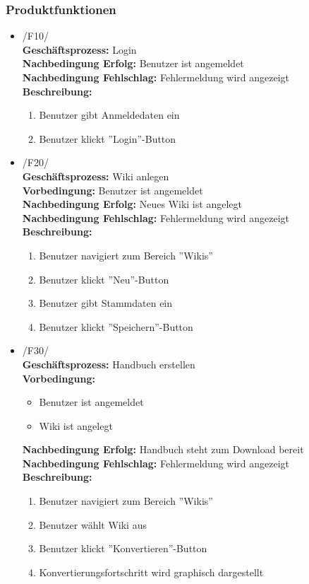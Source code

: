 \label{app:pflichtenheft}

\subsubsection*{Produktfunktionen}

	\begin{itemize}
		\item 
			/F10/ \\
			\textbf{Geschäftsprozess:} Login \\
			\textbf{Nachbedingung Erfolg:} Benutzer ist angemeldet \\
			\textbf{Nachbedingung Fehlschlag:} Fehlermeldung wird angezeigt \\
			\textbf{Beschreibung:}
			\begin{enumerate}
				\item Benutzer gibt Anmeldedaten ein
				\item Benutzer klickt ''Login''-Button
			\end{enumerate}
		\item 
			/F20/ \\
			\textbf{Geschäftsprozess:} Wiki anlegen \\
			\textbf{Vorbedingung:} Benutzer ist angemeldet \\
			\textbf{Nachbedingung Erfolg:} Neues Wiki ist angelegt \\
			\textbf{Nachbedingung Fehlschlag:} Fehlermeldung wird angezeigt \\
			\textbf{Beschreibung:}
			\begin{enumerate}
				\item Benutzer navigiert zum Bereich ''Wikis''
				\item Benutzer klickt ''Neu''-Button
				\item Benutzer gibt Stammdaten ein
				\item Benutzer klickt ''Speichern''-Button
			\end{enumerate}
		\item 
			/F30/ \\
			\textbf{Geschäftsprozess:} Handbuch erstellen \\
			\textbf{Vorbedingung:}
			\begin{itemize}
				\item Benutzer ist angemeldet
				\item Wiki ist angelegt
			\end{itemize}
			\textbf{Nachbedingung Erfolg:} Handbuch steht zum Download bereit \\
			\textbf{Nachbedingung Fehlschlag:} Fehlermeldung wird angezeigt \\
			\textbf{Beschreibung:}
			\begin{enumerate}
				\item Benutzer navigiert zum Bereich ''Wikis''
				\item Benutzer wählt Wiki aus
				\item Benutzer klickt ''Konvertieren''-Button
				\item Konvertierungsfortschritt wird graphisch dargestellt
			\end{enumerate}
	\end{itemize}